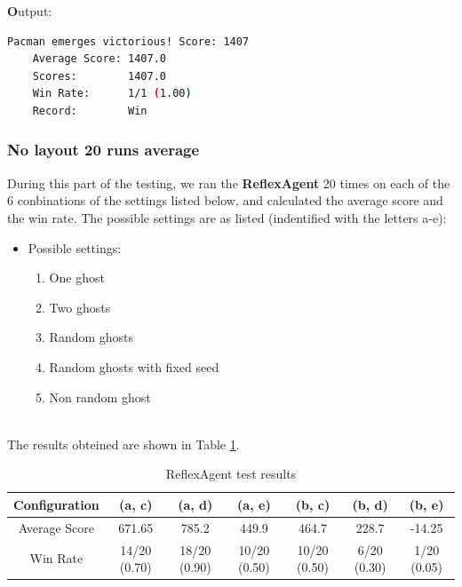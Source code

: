 \documentclass{article}
\begin{document}
\noindent\textbf Output:

\begin{lstlisting}[language=bash, frame=tlbr, framesep=6pt, backgroundcolor=\color{light-gray}]
    Pacman emerges victorious! Score: 1407
    Average Score: 1407.0
    Scores:        1407.0
    Win Rate:      1/1 (1.00)
    Record:        Win
\end{lstlisting}

\subsubsection{No layout 20 runs average}
\label{sec:20runs}

During this part of the testing, we ran the \textbf{ReflexAgent} 20 times on each of the 6 conbinations of the settings listed below, and calculated the average score and the win rate. The possible settings are as listed (indentified with the letters a-e):

\begin{itemize}
  \item Possible settings:
  \begin{enumerate}[label=(\alph*)]
    \item One ghost
    \item Two ghosts
    \item Random ghosts
    \item Random ghosts with fixed seed
    \item Non random ghost
  \end{enumerate}
\end{itemize}

~\\
The results obteined are shown in Table \ref{tab:reflexagent}.

\begin{table}[!ht]
  \begin{center}
  \begin{tabular}{||c||c|c|c|c|c|c||}
  \hline
  Configuration & (a, c) & (a, d) & (a, e) & (b, c) & (b, d) & (b, e) \\
  \hline\hline
  Average Score & 671.65 & 785.2 & 449.9 & 464.7 & 228.7 & -14.25 \\
  \hline\hline
  Win Rate & 14/20 (0.70) & 18/20 (0.90) & 10/20 (0.50) & 10/20 (0.50) & 6/20 (0.30) & 1/20 (0.05) \\
  \hline
  \end{tabular}
  \caption{ReflexAgent test results}
  \label{tab:reflexagent}
  \end{center}
\end{table}
\end{document}

